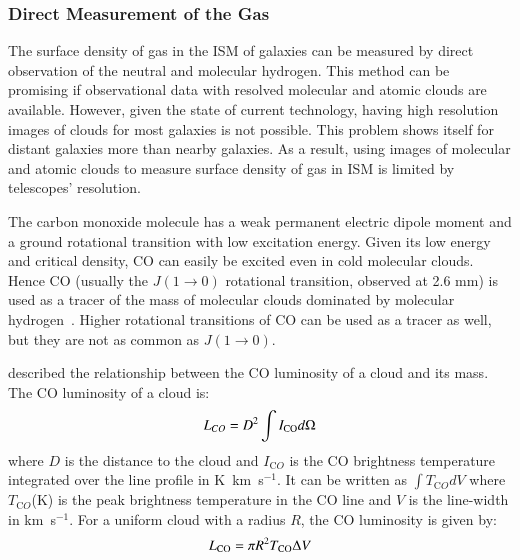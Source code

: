 \subsubsection{Direct Measurement of the Gas}

The surface density of gas in the ISM of galaxies can be measured by direct observation of the neutral and molecular hydrogen.
This method can be promising if observational data with resolved molecular and atomic clouds are available.
However, given the state of current technology, having high resolution images of clouds for most galaxies is not possible. 
This problem shows itself for distant galaxies more than nearby galaxies. 
As a result, using images of molecular and atomic clouds to measure surface density of gas in ISM is limited by telescopes' resolution. 
 
The carbon monoxide molecule has a weak permanent electric dipole moment and a ground rotational transition with low excitation energy. 
Given its low energy and critical density, CO can easily be excited even in cold molecular clouds.
Hence CO (usually the $J(1\rightarrow 0)$ rotational transition, observed at 2.6 mm) is used as a tracer of the mass of molecular clouds dominated by molecular hydrogen~\citep[e.g.][] {Sanders84}.
Higher rotational transitions of CO can be used as a tracer as well, but they are not as common as $J(1\rightarrow 0)$.

\cite{Young91} described the relationship between the CO luminosity of a cloud and its mass. The CO luminosity of a cloud is:
\begin{equation}
L_{CO} = D^2 \int I_{\rm CO} d\Omega 
\end{equation}
where $D$ is the distance to the cloud and 
$I_{\mathrm CO}$ is the CO brightness temperature integrated over the line profile in K~km~s$^{-1}$.
It can be written as ${\int T_{\mathrm CO} dV}$ where $T_{\mathrm CO}$(K) is the peak brightness temperature in the CO line and $V$ is the line-width in km~s$^{-1}$.
For a uniform cloud with a radius $R$, the CO luminosity is given by:
 \begin{equation}
L_{\rm CO} = \pi R^2 T_{\rm CO} \Delta V
\end{equation}


